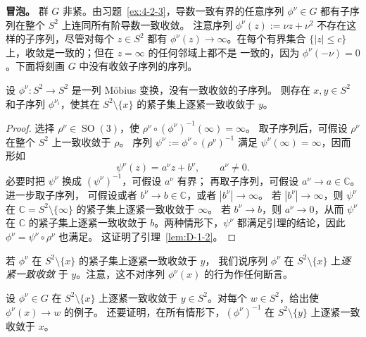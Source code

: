 \noindent\textbf{冒泡。}
群 $G$ 非紧。由习题~\ref{ex:4-2-3}，导数一致有界的任意序列
$\phi^\nu\in G$ 都有子序列在整个 $S^2$ 上连同所有阶导数一致收敛。
注意序列 $\phi^\nu(z):=\nu z+\nu^2$ 不存在这样的子序列，尽管对每个
$z\in S^2$ 都有 $\phi^\nu(z)\to\infty$。在每个有界集合
$\{|z|\le c\}$ 上，收敛是一致的；但在 $z=\infty$ 的任何邻域上都不是
一致的，因为 $\phi^\nu(-\nu)=0$。下面将刻画 $G$ 中没有收敛子序列的序列。

\begin{lemma}\label{lem:D-1-2}
设 $\phi^\nu:S^2\to S^2$ 是一列 Möbius 变换，没有一致收敛的子序列。
则存在 $x,y\in S^2$ 和子序列 $\phi^{\nu_i}$，使其在
$S^2\setminus\{x\}$ 的紧子集上逐紧一致收敛于 $y$。
\end{lemma}
\begin{proof}
选择 $\rho^\nu\in\operatorname{SO}(3)$，使
$\rho^\nu\circ(\phi^\nu)^{-1}(\infty)=\infty$。
取子序列后，可假设 $\rho^\nu$ 在整个 $S^2$ 上一致收敛于 $\rho$。
序列 $\psi^\nu:=\phi^\nu\circ(\rho^\nu)^{-1}$ 满足
$\psi^\nu(\infty)=\infty$，因而形如
\[
  \psi^\nu(z)=a^\nu z+b^\nu,\qquad a^\nu\ne0.
\]
必要时把 $\psi^\nu$ 换成 $(\psi^\nu)^{-1}$，可假设 $a^\nu$ 有界；
再取子序列，可假设 $a^\nu\to a\in\mathbb C$。进一步取子序列，
可假设或者 $b^\nu\to b\in\mathbb C$，或者 $|b^\nu|\to\infty$。
若 $|b^\nu|\to\infty$，则 $\psi^\nu$ 在
$\mathbb C=S^2\setminus\{\infty\}$ 的紧子集上逐紧一致收敛于 $\infty$。
若 $b^\nu\to b$，则 $a^\nu\to0$，从而 $\psi^\nu$ 在
$\mathbb C$ 的紧子集上逐紧一致收敛于 $b$。两种情形下，$\psi^\nu$
都满足引理的结论，因此 $\phi^\nu=\psi^\nu\circ\rho^\nu$ 也满足。
这证明了引理~\ref{lem:D-1-2}。
\end{proof}

若 $\phi^\nu$ 在 $S^2\setminus\{x\}$ 的紧子集上逐紧一致收敛于 $y$，
我们说序列 $\phi^\nu$ 在 $S^2\setminus\{x\}$ 上\emph{逐紧一致收敛}
于 $y$。注意，这不对序列 $\phi^\nu(x)$ 的行为作任何断言。

\begin{exercise}\label{ex:D-1-3}
设 $\phi^\nu\in G$ 在 $S^2\setminus\{x\}$ 上逐紧一致收敛于
$y\in S^2$。对每个 $w\in S^2$，给出使 $\phi^\nu(x)\to w$ 的例子。
还要证明，在所有情形下，$(\phi^\nu)^{-1}$ 在
$S^2\setminus\{y\}$ 上逐紧一致收敛于 $x$。
\end{exercise}

